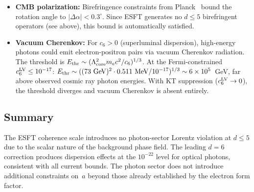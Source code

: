 ﻿\documentclass[a4paper,12pt]{article}
\begin{document}
\begin{itemize}
  \item \textbf{CMB polarization:} Birefringence constraints from
    Planck~\cite{Planck2020} bound the rotation angle to
    $|\Delta\alpha| < 0.3^\circ$.  Since ESFT generates no $d\leq 5$
    birefringent operators (see above), this bound is automatically
    satisfied.

  \item \textbf{Vacuum Cherenkov:} For $c_6>0$ (superluminal
    dispersion), high-energy photons could emit electron-positron
    pairs via vacuum Cherenkov radiation.  The threshold is
    $E_{\rm thr}\sim (\Lambda_{\rm core}^2 m_e c^2/c_6)^{1/3}$.
    At the Fermi-constrained $c_6^{\rm LV}\leq 10^{-17}$:
    $E_{\rm thr}\sim ((73~\text{GeV})^2\cdot 0.511~\text{MeV}
    /10^{-17})^{1/3}\sim 6\times 10^{5}$~GeV,
    far above observed cosmic ray photon energies.  With KT
    suppression ($c_6^{\rm LV}\to 0$), the threshold diverges
    and vacuum Cherenkov is absent entirely.
\end{itemize}

\subsection{Summary}

The ESFT coherence scale introduces no photon-sector Lorentz violation
at $d\leq 5$ due to the scalar nature of the background phase field.
The leading $d=6$ correction produces dispersion effects at the
$10^{-22}$ level for optical photons, consistent with all current
bounds.  The photon sector does not introduce additional constraints
on~$a$ beyond those already established by the electron form factor.
\end{document}
